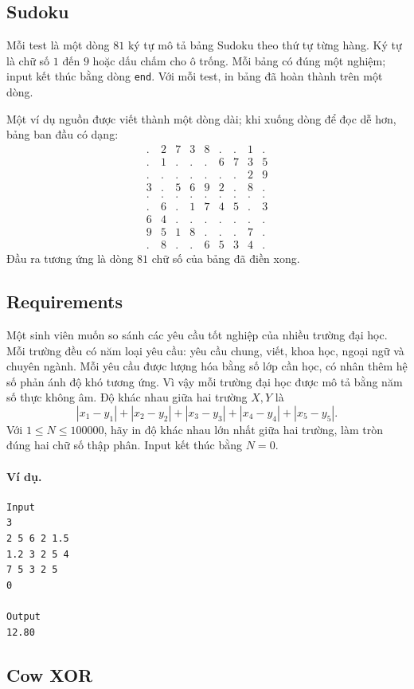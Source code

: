 \documentclass[11pt]{article}
\begin{document}
\subsection{Sudoku}

Mỗi test là một dòng \(81\) ký tự mô tả bảng Sudoku theo thứ tự từng hàng.
Ký tự là chữ số \(1\) đến \(9\) hoặc dấu chấm cho ô trống. Mỗi bảng có đúng
một nghiệm; input kết thúc bằng dòng \texttt{end}. Với mỗi test, in bảng đã
hoàn thành trên một dòng.

Một ví dụ nguồn được viết thành một dòng dài; khi xuống dòng để đọc dễ hơn,
bảng ban đầu có dạng:
\[
\begin{array}{ccccccccc}
.&2&7&3&8&.&.&1&.\\
.&1&.&.&.&6&7&3&5\\
.&.&.&.&.&.&.&2&9\\
3&.&5&6&9&2&.&8&.\\
.&.&.&.&.&.&.&.&.\\
.&6&.&1&7&4&5&.&3\\
6&4&.&.&.&.&.&.&.\\
9&5&1&8&.&.&.&7&.\\
.&8&.&.&6&5&3&4&.
\end{array}
\]
Đầu ra tương ứng là dòng \(81\) chữ số của bảng đã điền xong.

\subsection{Requirements}

Một sinh viên muốn so sánh các yêu cầu tốt nghiệp của nhiều trường đại học.
Mỗi trường đều có năm loại yêu cầu: yêu cầu chung, viết, khoa học, ngoại ngữ
và chuyên ngành. Mỗi yêu cầu được lượng hóa bằng số lớp cần học, có nhân thêm
hệ số phản ánh độ khó tương ứng. Vì vậy mỗi trường đại học được mô tả bằng
năm số thực không âm. Độ khác nhau giữa hai trường \(X,Y\) là
\[
  |x_1-y_1|+|x_2-y_2|+|x_3-y_3|+|x_4-y_4|+|x_5-y_5|.
\]
Với \(1\le N\le 100000\), hãy in độ khác nhau lớn nhất giữa hai trường, làm
tròn đúng hai chữ số thập phân. Input kết thúc bằng \(N=0\).

\paragraph{Ví dụ.}
\begin{verbatim}
Input
3
2 5 6 2 1.5
1.2 3 2 5 4
7 5 3 2 5
0

Output
12.80
\end{verbatim}

\subsection{Cow XOR}
\end{document}

